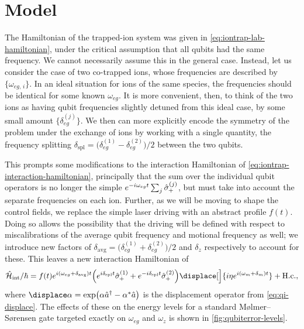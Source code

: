 \section{Model}

The Hamiltonian of the trapped-ion system was given in \cref{eq:iontrap-lab-hamiltonian}, under the critical assumption that all qubits had the same frequency.
We cannot necessarily assume this in the general case.
Instead, let us consider the case of two co-trapped ions, whose frequencies are described by $\{\omega_{eg,\,i}\}$.
In an ideal situation for ions of the same species, the frequencies should be identical for some known $\omega_{eg}$.
It is more convenient, then, to think of the two ions as having qubit frequencies slightly detuned from this ideal case, by some small amount $\bigl\{\delta_{eg}^{(j)}\bigr\}$.
We then can more explicitly encode the symmetry of the problem under the exchange of ions by working with a single quantity, the frequency splitting $\delta_{\text{spl}} = \bigl(\delta_{eg}^{(1)} - \delta_{eg}^{(2)}\bigr)/2$ between the two qubits.

This prompts some modifications to the interaction Hamiltonian of \cref{eq:iontrap-interaction-hamiltonian}, principally that the sum over the individual qubit operators is no longer the simple $e^{-i\omega_{eg}t}\sum_j\sp^{(j)}$, but must take into account the separate frequencies on each ion.
Further, as we will be moving to shape the control fields, we replace the simple laser driving with an abstract profile $f(t)$.
Doing so allows the possibility that the driving will be defined with respect to miscalibrations of the average qubit frequency and motional frequency as well; we introduce new factors of $\delta_{\text{avg}} = \bigl(\delta_{eg}^{(1)} + \delta_{eg}^{(2)}\bigr)/2$ and $\delta_z$ respectively to account for these.
This leaves a new interaction Hamiltonian of
\begin{equation}\label{eq:qubiterror-interaction-hamiltonian}
\H_{\text{int}}/\hbar = f(t) e^{i(\omega_{eg} + \delta_{\text{avg}})t}
    \Bigl(e^{i\delta_{\text{spl}} t}\sp^{(1)}
          + e^{-i\delta_{\text{spl}} t}\sp^{(2)}\Bigr) \displace[\Big]{i\eta e^{i(\omega_m + \delta_m)t}} + \hc,
\end{equation}
where $\displace\alpha = \exp\bigl(\alpha\a^\dagger - \alpha^*\a\bigr)$ is the displacement operator from \cref{eq:qi-displace}.
The effects of these on the energy levels for a standard M\o lmer--S\o rensen gate targeted exactly on $\omega_{eg}$ and $\omega_z$ is shown in \cref{fig:qubiterror-levels}.

